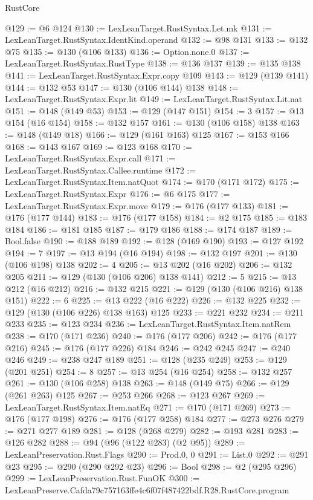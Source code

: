 \begin{lexlean}{RustCore}
\begin{coremodule}
@129 := @6 @124
@130 := LexLeanTarget.RustSyntax.Let.mk
@131 := LexLeanTarget.RustSyntax.IdentKind.operand
@132 := @98 @131
@133 := @132 @75
@135 := @130 (@106 @133)
@136 := Option.none.{0}
@137 := LexLeanTarget.RustSyntax.RustType
@138 := @136 @137
@139 := @135 @138
@141 := LexLeanTarget.RustSyntax.Expr.copy @109
@143 := @129 (@139 @141)
@144 := @132 @53
@147 := @130 (@106 @144) @138
@148 := LexLeanTarget.RustSyntax.Expr.lit
@149 := LexLeanTarget.RustSyntax.Lit.nat
@151 := @148 (@149 @53)
@153 := @129 (@147 @151)
@154 := 3
@157 := @13 @154 (@16 @154)
@158 := @132 @157
@161 := @130 (@106 @158) @138
@163 := @148 (@149 @18)
@166 := @129 (@161 @163) @125
@167 := @153 @166
@168 := @143 @167
@169 := @123 @168
@170 := LexLeanTarget.RustSyntax.Expr.call
@171 := LexLeanTarget.RustSyntax.Callee.runtime
@172 := LexLeanTarget.RustSyntax.Item.natQuot
@174 := @170 (@171 @172)
@175 := LexLeanTarget.RustSyntax.Expr
@176 := @6 @175
@177 := LexLeanTarget.RustSyntax.Expr.move
@179 := @176 (@177 @133)
@181 := @176 (@177 @144)
@183 := @176 (@177 @158)
@184 := @2 @175
@185 := @183 @184
@186 := @181 @185
@187 := @179 @186
@188 := @174 @187
@189 := Bool.false
@190 := @188 @189
@192 := @128 (@169 @190)
@193 := @127 @192
@194 := 7
@197 := @13 @194 (@16 @194)
@198 := @132 @197
@201 := @130 (@106 @198) @138
@202 := 4
@205 := @13 @202 (@16 @202)
@206 := @132 @205
@211 := @129 (@130 (@106 @206) @138 @141)
@212 := 5
@215 := @13 @212 (@16 @212)
@216 := @132 @215
@221 := @129 (@130 (@106 @216) @138 @151)
@222 := 6
@225 := @13 @222 (@16 @222)
@226 := @132 @225
@232 := @129 (@130 (@106 @226) @138 @163) @125
@233 := @221 @232
@234 := @211 @233
@235 := @123 @234
@236 := LexLeanTarget.RustSyntax.Item.natRem
@238 := @170 (@171 @236)
@240 := @176 (@177 @206)
@242 := @176 (@177 @216)
@245 := @176 (@177 @226) @184
@246 := @242 @245
@247 := @240 @246
@249 := @238 @247 @189
@251 := @128 (@235 @249)
@253 := @129 (@201 @251)
@254 := 8
@257 := @13 @254 (@16 @254)
@258 := @132 @257
@261 := @130 (@106 @258) @138
@263 := @148 (@149 @75)
@266 := @129 (@261 @263) @125
@267 := @253 @266
@268 := @123 @267
@269 := LexLeanTarget.RustSyntax.Item.natEq
@271 := @170 (@171 @269)
@273 := @176 (@177 @198)
@276 := @176 (@177 @258) @184
@277 := @273 @276
@279 := @271 @277 @189
@281 := @128 (@268 @279)
@282 := @193 @281
@283 := @126 @282
@288 := @94 (@96 (@122 @283) (@2 @95))
@289 := LexLeanPreservation.Rust.Flags
@290 := Prod.{0, 0}
@291 := List.{0}
@292 := @291 @23
@295 := @290 (@290 @292 @23)
@296 := Bool
@298 := @2 (@295 @296)
@299 := LexLeanPreservation.Rust.FunOK
@300 := LexLeanPreserve.Cafda79c757163ffe4c6f07f487422bdf.R28.RustCore.program

\end{coremodule}
\end{lexlean}
